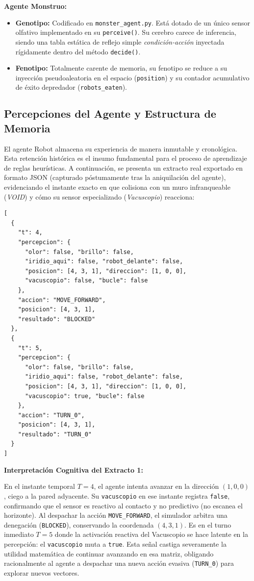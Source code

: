 \documentclass[conference]{IEEEtran}
\begin{document}
\textbf{Agente Monstruo:}
\begin{itemize}
    \item \textbf{Genotipo:} Codificado en \texttt{monster\_agent.py}. Está dotado de un único sensor olfativo implementado en su \texttt{perceive()}. Su cerebro carece de inferencia, siendo una tabla estática de reflejo simple \textit{condición-acción} inyectada rígidamente dentro del método \texttt{decide()}.
    \item \textbf{Fenotipo:} Totalmente carente de memoria, su fenotipo se reduce a su inyección pseudoaleatoria en el espacio (\texttt{position}) y su contador acumulativo de éxito depredador (\texttt{robots\_eaten}).
\end{itemize}

\subsection{Percepciones del Agente y Estructura de Memoria}
El agente Robot almacena su experiencia de manera inmutable y cronológica. Esta retención histórica es el insumo fundamental para el proceso de aprendizaje de reglas heurísticas. A continuación, se presenta un extracto real exportado en formato JSON (capturado póstumamente tras la aniquilación del agente), evidenciando el instante exacto en que colisiona con un muro infranqueable (\textit{VOID}) y cómo su sensor especializado (\textit{Vacuscopio}) reacciona:

{\scriptsize
\begin{verbatim}
[
  {
    "t": 4,
    "percepcion": {
      "olor": false, "brillo": false,
      "iridio_aqui": false, "robot_delante": false,
      "posicion": [4, 3, 1], "direccion": [1, 0, 0],
      "vacuscopio": false, "bucle": false
    },
    "accion": "MOVE_FORWARD",
    "posicion": [4, 3, 1],
    "resultado": "BLOCKED"
  },
  {
    "t": 5,
    "percepcion": {
      "olor": false, "brillo": false,
      "iridio_aqui": false, "robot_delante": false,
      "posicion": [4, 3, 1], "direccion": [1, 0, 0],
      "vacuscopio": true, "bucle": false
    },
    "accion": "TURN_0",
    "posicion": [4, 3, 1],
    "resultado": "TURN_0"
  }
]
\end{verbatim}
}

\textbf{Interpretación Cognitiva del Extracto 1:}

En el instante temporal $T=4$, el agente intenta avanzar en la dirección $(1, 0, 0)$, ciego a la pared adyacente. Su \texttt{vacuscopio} en ese instante registra \texttt{false}, confirmando que el sensor es reactivo al contacto y no predictivo (no escanea el horizonte). Al despachar la acción \texttt{MOVE\_FORWARD}, el simulador arbitra una denegación (\texttt{BLOCKED}), conservando la coordenada $(4,3,1)$. Es en el turno inmediato $T=5$ donde la activación reactiva del Vacuscopio se hace latente en la percepción: el \texttt{vacuscopio} muta a \texttt{true}. Esta señal castiga severamente la utilidad matemática de continuar avanzando en esa matriz, obligando racionalmente al agente a despachar una nueva acción evasiva (\texttt{TURN\_0}) para explorar nuevos vectores.
\end{document}
